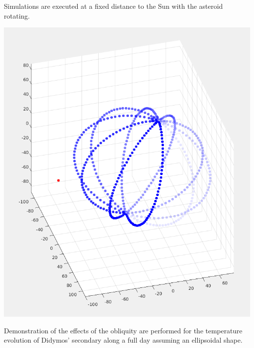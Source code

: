 Simulations are executed at a fixed distance to the Sun with the asteroid rotating.
\begin{center}
    \includegraphics[width=\linewidth]{rsc/obldemo5.png}
\end{center}
Demonstration of the effects of the obliquity are performed for the temperature evolution of Didymos' secondary along a full day assuming an ellipsoidal shape.
